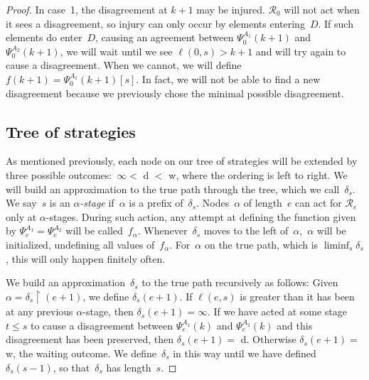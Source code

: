 \documentclass{LMCS}
\def\res{\!\!\upharpoonright\!}     \def\eres{\!\upharpoonright\!}     \def\nes{n_{e,s}}
\newcommand{\0}{\mathbf{0}}
\newcommand{\<}{\langle}
\renewcommand{\>}{\rangle}
\begin{document}
\begin{proof}
\noindent In case~1, the disagreement at $k+1$ may be injured. $\mathcal R_0$ will not
act when it sees a disagreement, so injury can only occur by elements
entering~$D$. If such elements do enter~$D$, causing an agreement between
$\Psi_0^{A_1}(k+1)$ and $\Psi_0^{A_2}(k+1)$, we will wait until we see
$\ell(0,s)>k+1$ and will try again to cause a disagreement. When we cannot,
we will define $f(k+1)=\Psi_0^{A_1}(k+1)[s]$. In fact, we will not be able to
find a new disagreement because we previously chose the minimal possible
disagreement.



\subsection{Tree of strategies}\label{treeofstrategies}

As mentioned previously, each node on our tree of strategies will be extended
by three possible outcomes:~$\infty<$ d $<$ w, where the ordering is left to
right.  We will build an approximation to the true path through the tree,
which we call~$\delta_s$.  We say~$s$ is an {\em $\alpha$-stage} if~$\alpha$
is a prefix of~$\delta_s$.  Nodes~$\alpha$ of length~$e$ can act for
$\mathcal R_e$ only at $\alpha$-stages.  During such action, any attempt at
defining the function given by $\Psi_e^{A_1}=\Psi_e^{A_2}$ will be
called~$f_\alpha$.  Whenever~$\delta_s$ moves to the left
of~$\alpha$,~$\alpha$ will be initialized, undefining all values
of~$f_\alpha$.  For~$\alpha$ on the true path, which is  $\liminf_s
\delta_s$, this will only happen finitely often.

We build an approximation~$\delta_s$ to the true path recursively as follows:
Given $\alpha=\delta_s\res (e+1)$, we define $\delta_s(e+1)$.
If $\ell(e,s)$ is greater than it has been at any previous $\alpha$-stage,
then $\delta_s(e+1)=\infty$.
If we have acted at some stage $t\leq s$ to cause a disagreement between
$\Psi_e^{A_1}(k)$ and $\Psi_e^{A_2}(k)$ and this disagreement has been
preserved, then $\delta_s(e+1)=$ d. Otherwise $\delta_s(e+1)=$ w, the waiting
outcome. We define~$\delta_s$ in this way until we have defined
$\delta_s(s-1)$, so that~$\delta_s$ has length~$s$.


\end{proof}
\end{document}
